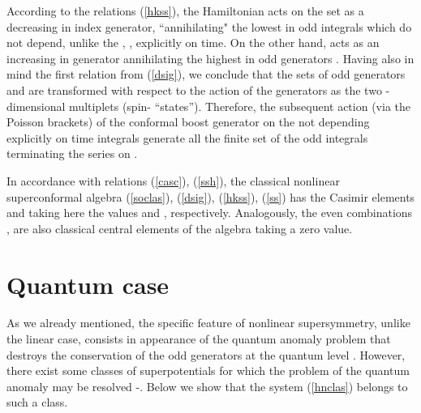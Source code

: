 \documentclass[a4paper,12pt]{article}
\begin{document}
According to the relations (\ref{hkss}), the Hamiltonian
acts on the set  \coordHE{}
as a decreasing in index \coordHE{} generator,
``annihilating" the lowest in \coordHE{} odd integrals
\coordHE{} which do not depend,
unlike the \coordHE{}, \coordHE{},
explicitly on time.
On the other hand,
\coordHE{} acts as an increasing in \coordHE{}
generator annihilating the highest in \coordHE{} odd
generators \coordHE{}.
Having also in mind the first relation from
(\ref{dsig}),
we conclude that the sets of odd generators
\coordHE{} and \coordHE{} are transformed with respect
to the action of the \coordHE{} generators as the
two  \coordHE{}-dimensional multiplets
(spin-\coordHE{} ``states'').
Therefore, the subsequent action (via the Poisson brackets)
of the conformal boost generator \coordHE{}
on the not depending explicitly on time
integrals \coordHE{} generate all the
finite set of the odd integrals \coordHE{}
terminating the series on \coordHE{}.

In accordance with
relations (\ref{casc}), (\ref{ssh}),
the classical nonlinear
superconformal algebra
(\ref{soclas}), (\ref{dsig}), (\ref{hkss}),
(\ref{ss})
has the Casimir elements
\coordHE{} and
\coordHE{}
taking here the values \coordHE{}
and \coordHE{}, respectively.
Analogously, the even combinations
\coordHE{}  \coordHE{},
are also classical central elements of the
algebra taking a zero value.

\section{Quantum case}
As we already mentioned,
the specific feature  of
nonlinear
supersymmetry,
unlike the linear \coordHE{} case,
consists in appearance of
the quantum anomaly problem that destroys
the conservation of the odd generators at the quantum level
\cite{P1,KP1}.
However, there exist some classes of
superpotentials for which the problem of the quantum
anomaly may be resolved \cite{KP1}-\cite{KP2}.
Below we show that the system (\ref{hnclas})
belongs to such a class.
\end{document}
